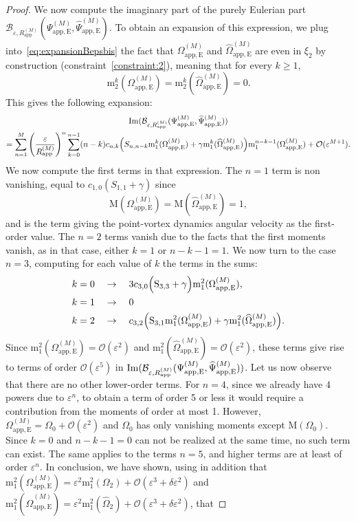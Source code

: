 \documentclass[11pt,reqno,a4paper]{amsart}
\def\eps{\varepsilon}
\def\Im{{\rm Im}}
\newcommand{\cB}{\mathcal{B}}
\newcommand{\cO}{\mathcal{O}}
\newcommand{\mrm}{\mathrm{m}}
\newcommand{\mrM}{\mathrm{M}}
\newcommand{\1}{\mathbbm{1}}
\theoremstyle{definition}
\theoremstyle{definition}
\numberwithin{equation}{section}
\newcommand{\Mapp}[2]{#1^{(#2)}_\mathrm{app}}
\newcommand{\Mappp}[3]{#1^{(#2)}_\mathrm{app,#3}}
\begin{document}
\begin{proof}
    We now compute the imaginary part of the purely Eulerian part $\cB_{\eps,\Mapp{R}{M}}(\Mappp{\Psi}{M}{E},\Mappp{\widehat{\Psi}}{M}{E})$. To obtain an expansion of this expression, we plug into~\eqref{eq:expansionBepsbis} the fact that $\Mappp{\Omega}{M}{E}$ and $\Mappp{\widehat{\Omega}}{M}{E}$ are even in $\xi_2$ by construction (constraint~\ref{constraint:2}), meaning that for every $k \ge 1$,
    \begin{equation}\label{eq:eulerian_part_even}
        \mrm^k_2(\Mappp{\Omega}{M}{E}) = \mrm^k_2(\Mappp{\widehat{\Omega}}{M}{E}) = 0.
    \end{equation}
    This gives the following expansion:
    \begin{multline}
        \Im(\cB_{\eps,\Mapp{R}{M}}(\Mappp{\Psi}{M}{E},\Mappp{\widehat{\Psi}}{M}{E})) \\ =\sum_{n=1}^M \left(\frac{\eps}{\Mapp{R}{M}}\right)^n \sum_{k=0}^{n-1} (n-k)c_{n,k} \Big( S_{n,n-k} \mrm_1^k( \Mappp{\Omega}{M}{E}) + \gamma \mrm_1^k( \Mappp{\widehat{\Omega}}{M}{E})\Big) \mrm_1^{n-k-1}(\Mappp{\Omega}{M}{E}) + \cO(\eps^{M+1}).
    \end{multline}
     We now compute the first terms in that expression. The $n=1$ term is non vanishing, equal to $c_{1,0} (S_{1,1}+\gamma)$ since
    \begin{equation}
        \mrM(\Mappp{\Omega}{M}{E}) = \mrM(\Mappp{\widehat{\Omega}}{M}{E}) = 1,
    \end{equation}
    and is the term giving the point-vortex dynamics angular velocity as the first-order value. The $n=2$ terms vanish due to the facts that the first moments vanish, as in that case, either $k = 1$ or $n-k-1 = 1$. We now turn to the case $n=3$, computing for each value of $k$ the terms in the sums:
    \begin{align}
        & k = 0 \quad \rightarrow \quad 3c_{3,0} \Big( {\rm S}_{3,3}  + \gamma\Big) \mrm_1^{2}(\Mappp{\Omega}{M}{E}), \\
        & k = 1 \quad \rightarrow \quad 0 \\
        & k = 2 \quad \rightarrow \quad c_{3,2} \Big( {\rm S}_{3,1} \mrm_1^2( \Mappp{\Omega}{M}{E}) + \gamma \mrm_1^2( \Mappp{\widehat{\Omega}}{M}{E})\Big).
    \end{align}
    Since $\mrm_1^2( \Mappp{\Omega}{M}{E}) = \cO(\eps^2)$ and $\mrm_1^2( \Mappp{\widehat{\Omega}}{M}{E}) = \cO(\eps^2)$, these terms give rise to terms of order $\cO(\eps^5)$ in $\Im(\cB_{\eps,\Mapp{R}{M}}(\Mappp{\Psi}{M}{E},\Mappp{\widehat{\Psi}}{M}{E}))$. Let us now observe that there are no other lower-order terms. For $n=4$, since we already have  $4$ powers due to $\eps^n$, to obtain a term of order 5 or less it would require a contribution from the moments of order at most 1. However, $\Mappp{\Omega}{M}{E} = \Omega_0 + \cO(\eps^2)$ and $\Omega_0$ has only vanishing moments except $\mrM(\Omega_0)$. Since $k=0$ and $n-k-1 = 0$ can not be realized at the same time, no such term can exist. The same applies to the terms $n=5$, and higher terms are at least of order $\eps^n$. In conclusion, we have shown, using in addition that $\mrm_1^{2}(\Mappp{\Omega}{M}{E}) = \eps^2\mrm_1^2(\Omega_2) + \cO(\eps^3+\delta \eps^2)$ and $\mrm_1^{2}(\Mappp{\widehat{\Omega}}{M}{E}) = \eps^2\mrm_1^2(\widehat{\Omega}_2) + \cO(\eps^3+\delta \eps^2)$, that

\end{proof}
\end{document}
